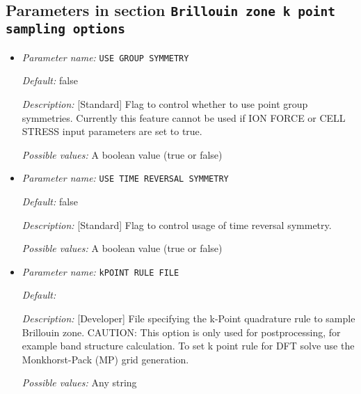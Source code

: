 \subsection{Parameters in section \tt Brillouin zone k point sampling options}
\label{parameters:Brillouin_20zone_20k_20point_20sampling_20options}

\begin{itemize}
\item {\it Parameter name:} {\tt USE GROUP SYMMETRY}
\label{parameters:Brillouin zone k point sampling options/USE GROUP SYMMETRY}
\label{parameters:Brillouin_20zone_20k_20point_20sampling_20options/USE_20GROUP_20SYMMETRY}




{\it Default:} false


{\it Description:} [Standard] Flag to control whether to use point group symmetries. Currently this feature cannot be used if ION FORCE or CELL STRESS input parameters are set to true.


{\it Possible values:} A boolean value (true or false)
\item {\it Parameter name:} {\tt USE TIME REVERSAL SYMMETRY}
\label{parameters:Brillouin zone k point sampling options/USE TIME REVERSAL SYMMETRY}
\label{parameters:Brillouin_20zone_20k_20point_20sampling_20options/USE_20TIME_20REVERSAL_20SYMMETRY}




{\it Default:} false


{\it Description:} [Standard] Flag to control usage of time reversal symmetry.


{\it Possible values:} A boolean value (true or false)
\item {\it Parameter name:} {\tt kPOINT RULE FILE}
\label{parameters:Brillouin zone k point sampling options/kPOINT RULE FILE}
\label{parameters:Brillouin_20zone_20k_20point_20sampling_20options/kPOINT_20RULE_20FILE}




{\it Default:} 


{\it Description:} [Developer] File specifying the k-Point quadrature rule to sample Brillouin zone. CAUTION: This option is only used for postprocessing, for example band structure calculation. To set k point rule for DFT solve use the Monkhorst-Pack (MP) grid generation.


{\it Possible values:} Any string
\end{itemize}



